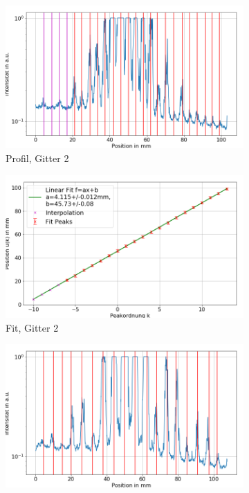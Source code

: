 \documentclass[
	a4paper,
	12pt,
	pagesize,
	ngerman
]{scrartcl}
\begin{document}
\begin{figure}[H]
\begin{subfigure}[b]{0.475\textwidth}
            \centering
            \includegraphics[width=\textwidth]{img/2/2_gitter_g2}
            \caption%
            {Profil, Gitter 2}
            \label{fig_2_profil_g2}
        \end{subfigure}
        \hfill
        \begin{subfigure}[b]{0.475\textwidth}
            \centering
            \includegraphics[width=\textwidth]{img/2/2_gitter_g2_fit}
            \caption[]%
            {Fit, Gitter 2}
            \label{fig_2_fit_g2}
        \end{subfigure}
        \begin{subfigure}[b]{0.475\textwidth}
            \centering
            \includegraphics[width=\textwidth]{img/2/2_gitter_g3}

\end{subfigure}
\end{figure}
\end{document}
